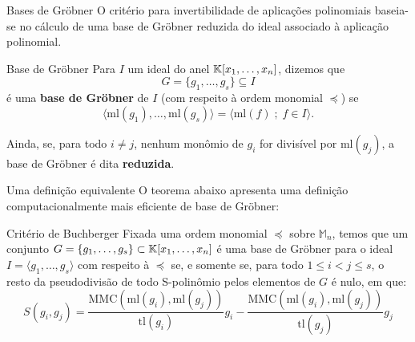 \begin{frame}[t]{Bases de Gröbner}
\vspace{0.6cm}
O critério para invertibilidade de aplicações polinomiais baseia-se no cálculo de uma base de Gröbner reduzida do ideal associado à aplicação polinomial.
\vspace{0.1cm}
\begin{defbox}{Base de Gröbner}
Para $I$ um ideal do anel $\mathbb{K}[x_1,\ldots,x_n]$, dizemos que
\[
G=\{g_1,\ldots,g_s\}\subseteq I
\]
é uma \textbf{base de Gröbner} de \(I\) (com respeito à ordem monomial \(\preceq\)) se
\[
\langle \mathrm{ml}(g_1),\ldots,\mathrm{ml}(g_s)\rangle
=
\langle \mathrm{ml}(f)\; ;\; f\in I\rangle.\]

Ainda, se, para todo \(i\neq j\), nenhum monômio de \(g_i\) for divisível por
    \(\mathrm{ml}(g_j)\), a base de Gröbner é dita \textbf{reduzida}.
\end{defbox}

\end{frame}

\begin{frame}{Uma definição equivalente}
O teorema abaixo apresenta uma definição computacionalmente mais eficiente de base de Gröbner:
\vspace{0.5cm}
    \begin{teobox}{Critério de Buchberger}
            Fixada uma ordem monomial $\preceq$ sobre $\mathbb{M}_n$, temos que um conjunto $G = \{g_1, \ldots,g_s\} \subset \mathbb{K}[x_1 ,\ldots,x_n]$ é uma base de Gröbner para o ideal $I = \langle g_1, \ldots, g_s\rangle$ com respeito à $\preceq$ se, e somente se, para todo $1 \leq i < j \leq s$, o resto da pseudodivisão de todo S-polinômio pelos elementos de $G$ é nulo, em que: \[S(g_i,g_j)=\frac{\mathrm{MMC}(\mathrm{ml}(g_i),\mathrm{ml}(g_j))}{\mathrm{tl}(g_i)}g_i-\frac{\mathrm{MMC}(\mathrm{ml}(g_i),\mathrm{ml}(g_j))}{\mathrm{tl}(g_j)}g_j\] 
    \end{teobox}
\end{frame}